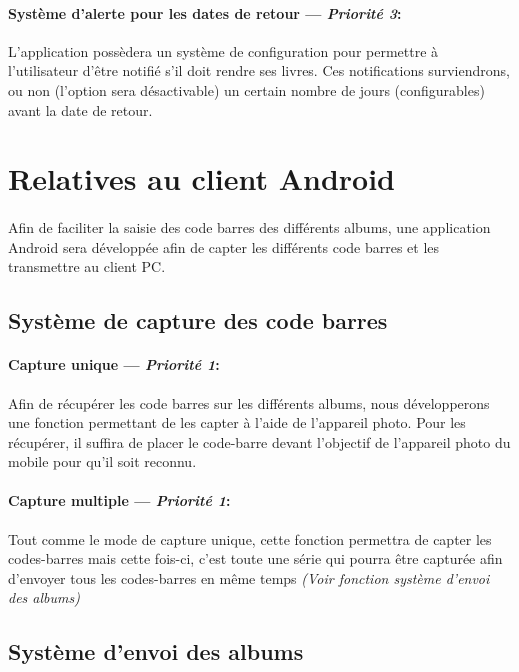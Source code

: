 \paragraph{Système d'alerte pour les dates de retour ---  \textit{Priorité 3}:}  
L'application possèdera un système de configuration pour permettre à l'utilisateur d'être notifié s'il doit rendre ses livres. Ces notifications surviendrons, ou non (l'option sera désactivable) un certain nombre de jours (configurables) avant la date de retour.



\section{Relatives au client Android} 


\paragraph{}
Afin de faciliter la saisie des code barres des différents albums, une application Android sera développée afin de capter les différents code barres et les transmettre au client PC.

\subsection{Système de capture des code barres}
\paragraph{Capture unique ---  \textit{Priorité 1}:}
Afin de récupérer les code barres sur les différents albums, nous développerons une fonction permettant de les capter à l'aide de l'appareil photo.
Pour les récupérer, il suffira de placer le code-barre devant l'objectif de l'appareil photo du mobile pour qu'il soit reconnu.

\paragraph{Capture multiple ---  \textit{Priorité 1}:}
Tout comme le mode de capture unique, cette fonction permettra de capter les codes-barres mais cette fois-ci, c'est toute une série qui pourra être capturée afin d'envoyer tous les codes-barres en même temps \textit{(Voir fonction système d'envoi des albums)}

\subsection{Système d'envoi des albums}
